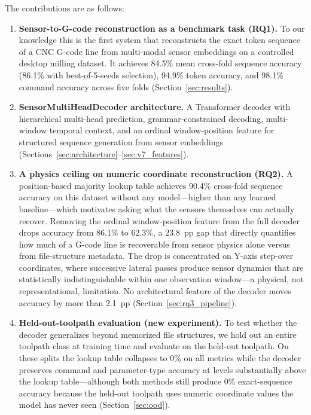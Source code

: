 \documentclass[sensors,article,submit,moreauthors,pdftex]{Definitions/mdpi}
\newcommand{\decodername}{SensorMultiHeadDecoder}
\begin{document}
The contributions are as follows:
\begin{enumerate}[leftmargin=*]
    \item \textbf{Sensor-to-G-code reconstruction as a benchmark task (RQ1).} To our knowledge this is the first system that reconstructs the exact token sequence of a CNC G-code line from multi-modal sensor embeddings on a controlled desktop milling dataset. It achieves 84.5\% mean cross-fold sequence accuracy (86.1\% with best-of-5-seeds selection), 94.9\% token accuracy, and 98.1\% command accuracy across five folds (Section~\ref{sec:results}).

    \item \textbf{\decodername{} architecture.} A Transformer decoder with hierarchical multi-head prediction, grammar-constrained decoding, multi-window temporal context, and an ordinal window-position feature for structured sequence generation from sensor embeddings (Sections~\ref{sec:architecture}--\ref{sec:v7_features}).

    \item \textbf{A physics ceiling on numeric coordinate reconstruction (RQ2).} A position-based majority lookup table achieves 90.4\% cross-fold sequence accuracy on this dataset without any model---higher than any learned baseline---which motivates asking what the sensors themselves can actually recover. Removing the ordinal window-position feature from the full decoder drops accuracy from 86.1\% to 62.3\%, a 23.8~pp gap that directly quantifies how much of a G-code line is recoverable from sensor physics alone versus from file-structure metadata. The drop is concentrated on Y-axis step-over coordinates, where successive lateral passes produce sensor dynamics that are statistically indistinguishable within one observation window---a physical, not representational, limitation. No architectural feature of the decoder moves accuracy by more than 2.1~pp (Section~\ref{sec:rq3_pipeline}).

    \item \textbf{Held-out-toolpath evaluation (new experiment).} To test whether the decoder generalizes beyond memorized file structures, we hold out an entire toolpath class at training time and evaluate on the held-out toolpath. On these splits the lookup table collapses to 0\% on all metrics while the decoder preserves command and parameter-type accuracy at levels substantially above the lookup table---although both methods still produce 0\% exact-sequence accuracy because the held-out toolpath uses numeric coordinate values the model has never seen (Section~\ref{sec:ood}).


\end{enumerate}
\end{document}
